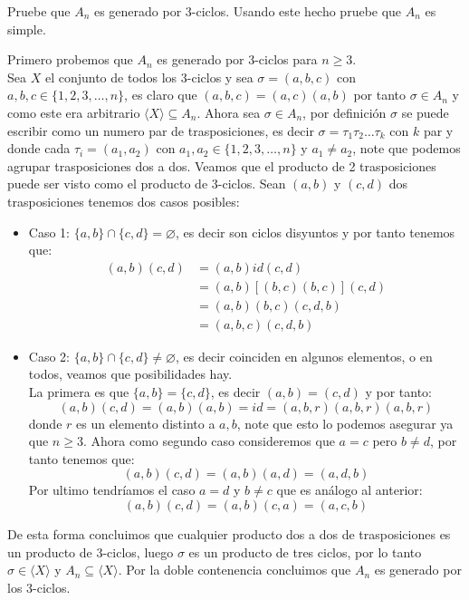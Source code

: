 \newpage
\begin{homeworkProblem}
    Pruebe que $A_n$ es generado por 3-ciclos. Usando este hecho pruebe que $A_n$ es simple.
    \begin{solucion}
    Primero probemos que $A_n$ es generado por 3-ciclos para $n\geq 3$.\\
    Sea $X$ el conjunto de todos los 3-ciclos y sea $\sigma=(a,b,c)$ con $a,b,c\in\{1,2,3,\dots,n \}$, es claro que $(a,b,c)=(a,c)(a,b)$ por tanto $\sigma\in A_n$ y como este era arbitrario $\langle X\rangle\subseteq A_n$. Ahora sea $\sigma\in A_n$, por definición $\sigma$ se puede escribir como un numero par de trasposiciones, es decir $\sigma=\tau_1\tau_2\dots\tau_k$ con $k$ par y donde cada $\tau_i=(a_1,a_2)$ con $a_1,a_2\in\{1,2,3,\dots,n \}$ y $a_1\neq a_2$, note que podemos agrupar trasposiciones dos a dos. Veamos que el producto de 2 trasposiciones puede ser visto como el producto de 3-ciclos. Sean $(a,b)$ y $(c,d)$ dos trasposiciones tenemos dos casos posibles:
    \begin{itemize}
        \item Caso 1: $\{a,b\}\cap\{c,d\}=\varnothing$, es decir son ciclos disyuntos y por tanto tenemos que:
        \begin{align*}
            (a,b)(c,d)&=(a,b)id(c,d)\\
            &=(a,b)[(b,c)(b,c)](c,d)\\
            &=(a,b)(b,c)(c,d,b)\\
            &=(a,b,c)(c,d,b)
        \end{align*}
        \item Caso 2: $\{a,b\}\cap\{c,d\}\neq\varnothing$, es decir coinciden en algunos elementos, o en todos, veamos que posibilidades hay.\\
        La primera es que $\{a,b\}=\{c,d\}$, es decir $(a,b)=(c,d)$ y por tanto:
        $$(a,b)(c,d)=(a,b)(a,b)=id=(a,b,r)(a,b,r)(a,b,r)$$
        donde $r$ es un elemento distinto a $a,b$, note que esto lo podemos asegurar ya que $n\geq 3$.
        Ahora como segundo caso consideremos que $a=c$ pero $b\neq d$, por tanto tenemos que:
        $$(a,b)(c,d)=(a,b)(a,d)=(a,d,b)$$
        Por ultimo tendríamos el caso $a=d$ y $b\neq c$ que es análogo al anterior:
        $$(a,b)(c,d)=(a,b)(c,a)=(a,c,b)$$
        \end{itemize}
        De esta forma concluimos que cualquier producto dos a dos de trasposiciones es un producto de 3-ciclos, luego $\sigma$ es un producto de tres ciclos, por lo tanto $\sigma\in\langle X\rangle$ y $A_n\subseteq\langle X\rangle$. Por la doble contenencia concluimos que $A_n$ es generado por los 3-ciclos.

\end{solucion}
\end{homeworkProblem}
